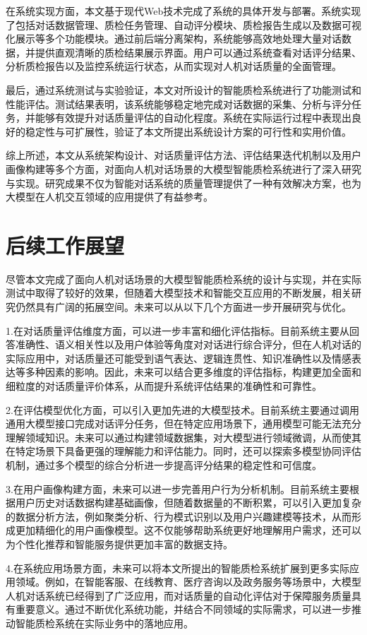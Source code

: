 在系统实现方面，本文基于现代Web技术完成了系统的具体开发与部署。系统实现了包括对话数据管理、质检任务管理、自动评分模块、质检报告生成以及数据可视化展示等多个功能模块。通过前后端分离架构，系统能够高效地处理大量对话数据，并提供直观清晰的质检结果展示界面。用户可以通过系统查看对话评分结果、分析质检报告以及监控系统运行状态，从而实现对人机对话质量的全面管理。

最后，通过系统测试与实验验证，本文对所设计的智能质检系统进行了功能测试和性能评估。测试结果表明，该系统能够稳定地完成对话数据的采集、分析与评分任务，并能够有效提升对话质量评估的自动化程度。系统在实际运行过程中表现出良好的稳定性与可扩展性，验证了本文所提出系统设计方案的可行性和实用价值。

综上所述，本文从系统架构设计、对话质量评估方法、评估结果迭代机制以及用户画像构建等多个方面，对面向人机对话场景的大模型智能质检系统进行了深入研究与实现。研究成果不仅为智能对话系统的质量管理提供了一种有效解决方案，也为大模型在人机交互领域的应用提供了有益参考。


\section{后续工作展望}
尽管本文完成了面向人机对话场景的大模型智能质检系统的设计与实现，并在实际测试中取得了较好的效果，但随着大模型技术和智能交互应用的不断发展，相关研究仍然具有广阔的拓展空间。未来可以从以下几个方面进一步开展研究与优化。

1.在对话质量评估维度方面，可以进一步丰富和细化评估指标。目前系统主要从回答准确性、语义相关性以及用户体验等角度对对话进行综合评分，但在人机对话的实际应用中，对话质量还可能受到语气表达、逻辑连贯性、知识准确性以及情感表达等多种因素的影响。因此，未来可以结合更多维度的评估指标，构建更加全面和细粒度的对话质量评价体系，从而提升系统评估结果的准确性和可靠性。

2.在评估模型优化方面，可以引入更加先进的大模型技术。目前系统主要通过调用通用大模型接口完成对话评分任务，但在特定应用场景下，通用模型可能无法充分理解领域知识。未来可以通过构建领域数据集，对大模型进行领域微调，从而使其在特定场景下具备更强的理解能力和评估能力。同时，还可以探索多模型协同评估机制，通过多个模型的综合分析进一步提高评分结果的稳定性和可信度。

3.在用户画像构建方面，未来可以进一步完善用户行为分析机制。目前系统主要根据用户历史对话数据构建基础画像，但随着数据量的不断积累，可以引入更加复杂的数据分析方法，例如聚类分析、行为模式识别以及用户兴趣建模等技术，从而形成更加精细化的用户画像模型。这不仅能够帮助系统更好地理解用户需求，还可以为个性化推荐和智能服务提供更加丰富的数据支持。

4.在系统应用场景方面，未来可以将本文所提出的智能质检系统扩展到更多实际应用领域。例如，在智能客服、在线教育、医疗咨询以及政务服务等场景中，大模型人机对话系统已经得到了广泛应用，而对话质量的自动化评估对于保障服务质量具有重要意义。通过不断优化系统功能，并结合不同领域的实际需求，可以进一步推动智能质检系统在实际业务中的落地应用。

